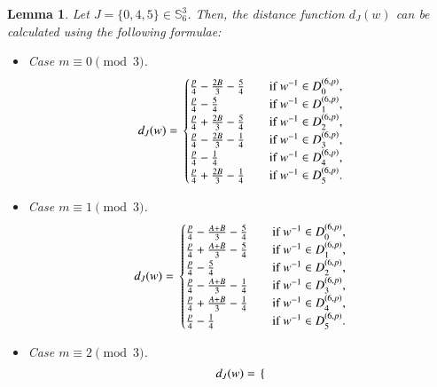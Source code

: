 \documentclass[letter]{ieice}
\newtheorem{sec3_lemma4}[sec3_lemma1]{Lemma}
\begin{document}
\begin{sec3_lemma4}\label{sec3-lamma4-label}
Let $ J=\lbrace0,4,5\rbrace \in  \mathbb{S}_{6}^{3}$. Then, the distance function $ d_{J}(w) $ can be calculated using the following formulae:
\begin{itemize}
\item Case $ m\equiv 0 \pmod 3 $.
\begin{equation*}
d_{J}(w)=\\                  
\begin{cases}
\frac{p}{4}-\frac{2B}{3}-\frac{5}{4}&\quad \mbox{if}\ w^{-1} \in  D_{0}^{(6,p)},\\
\frac{p}{4}-\frac{5}{4}&\quad \mbox{if}\ w^{-1} \in  D_{1}^{(6,p)},\\
\frac{p}{4}+\frac{2B}{3}-\frac{5}{4}&\quad \mbox{if}\ w^{-1} \in  D_{2}^{(6,p)},\\
\frac{p}{4}-\frac{2B}{3}-\frac{1}{4}&\quad \mbox{if}\ w^{-1} \in  D_{3}^{(6,p)},\\
\frac{p}{4}-\frac{1}{4}&\quad \mbox{if}\ w^{-1} \in  D_{4}^{(6,p)},\\
\frac{p}{4}+\frac{2B}{3}-\frac{1}{4}&\quad \mbox{if}\ w^{-1} \in  D_{5}^{(6,p)}.
\end{cases}
\end{equation*}
\item Case $ m\equiv 1 \pmod 3 $.
\begin{equation*}
d_{J}(w)=\\                  
\begin{cases}
\frac{p}{4}-\frac{A+B}{3}-\frac{5}{4}&\quad \mbox{if}\ w^{-1} \in  D_{0}^{(6,p)},\\
\frac{p}{4}+\frac{A+B}{3}-\frac{5}{4}&\quad \mbox{if}\ w^{-1} \in  D_{1}^{(6,p)},\\
\frac{p}{4}-\frac{5}{4}&\quad \mbox{if}\ w^{-1} \in  D_{2}^{(6,p)},\\
\frac{p}{4}-\frac{A+B}{3}-\frac{1}{4}&\quad \mbox{if}\ w^{-1} \in  D_{3}^{(6,p)},\\
\frac{p}{4}+\frac{A+B}{3}-\frac{1}{4}&\quad \mbox{if}\ w^{-1} \in  D_{4}^{(6,p)},\\
\frac{p}{4}-\frac{1}{4}&\quad \mbox{if}\ w^{-1} \in  D_{5}^{(6,p)}.
\end{cases}
\end{equation*}
\item Case $ m\equiv 2 \pmod 3 $.
\begin{equation*}
d_{J}(w)=\\                  
\begin{cases}

\end{cases}
\end{equation*}
\end{itemize}
\end{sec3_lemma4}
\end{document}
